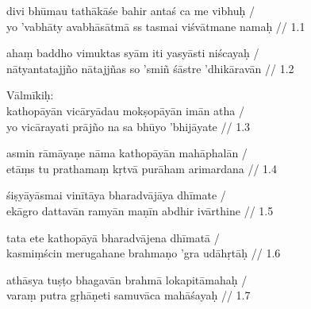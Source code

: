 \documentclass[a4paper,parskip,12pt]{scrarticle}
\begin{document}
\begin{otherlanguage}{iast}
  divi bhūmau tathākāśe bahir antaś ca me vibhuḥ /\\
  yo 'vabhāty avabhāsātmā ss tasmai viśvātmane namaḥ // 1.1

  ahaṃ baddho vimuktas syām iti yasyāsti niścayaḥ /\\
  nātyantatajjño nātajjñas so 'smiñ śāstre 'dhikāravān // 1.2

  Vālmīkiḥ:\\
  kathopāyān vicāryādau mokṣopāyān imān atha /\\
  yo vicārayati prājño na sa bhūyo 'bhijāyate // 1.3

  asmin rāmāyaṇe nāma kathopāyān mahāphalān /\\
  etāṃs tu prathamaṃ kṛtvā purāham arimardana // 1.4

  śiṣyāyāsmai vinītāya bharadvājāya dhīmate /\\
  ekāgro dattavān ramyān maṇīn abdhir ivārthine // 1.5

  tata ete kathopāyā bharadvājena dhīmatā /\\
  kasmiṃścin merugahane brahmaṇo 'gra udāhṛtāḥ // 1.6

  athāsya tuṣṭo bhagavān brahmā lokapitāmahaḥ /\\
  varaṃ putra gṛhāṇeti samuvāca mahāśayaḥ // 1.7
\end{otherlanguage}
\end{document}
